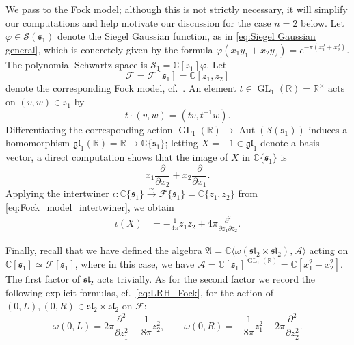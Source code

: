 \documentclass[reqno, 11pt]{amsart} %
\numberwithin{equation}{section}
\theoremstyle{plain}
\theoremstyle{definition}
\theoremstyle{remark}
\newcommand{\mbC}{\mathbb{C}}
\newcommand{\mcS}{\mathcal{S}}
\newcommand{\mfl}{\mathfrak{l}}
\newcommand{\mfs}{\mathfrak{s}}
\newcommand{\mfsl}{\mfs\mfl}
\newcommand{\bbC}{\mathbb C}
\newcommand{\calF}{\mathcal F}
\newcommand{\lie}[1]{ \mathfrak{#1}}
\newcommand{\isomto}{\stackrel{\sim}{\longrightarrow}}
\DeclareMathOperator{\GL}{GL}
\DeclareMathOperator{\Aut}{Aut}
\begin{document}
We pass to the Fock model; although this is not strictly necessary, it will simplify our computations  and help motivate our discussion for the case $n=2$ below. Let $\varphi \in \mcS(\mfs_1)$ denote the Siegel Gaussian function, as in  \eqref{eq:Siegel Gaussian general}, which is concretely given by the formula $\varphi(x_1 y_1 + x_2 y_2) = e^{- \pi (x_1^2 + x_2^2)}$. The polynomial Schwartz space is $\mathcal S_1 = \mathbb C[\lie{s_1}] \varphi$. Let
\[
\mathcal F = \mathcal F[ \lie s_1] = \bbC[z_1, z_2]
\]
denote the corresponding Fock model, cf.\ .
An element $t \in \GL_1(\mathbb R) = \mathbb R^{\times}$ acts on $ (v,w) \in \lie s_1$ by
\[ t\cdot (v,w) = (tv, t^{-1}w).
\]
Differentiating the corresponding action $\GL_1(\mathbb R) \to \Aut(\mcS(\lie s_1))$ induces a homomorphism $\lie{gl}_1(\mathbb R) = \mathbb R  \to \bbC\{ \lie s_1\}$; letting  $X = - 1 \in \lie{gl}_1$ denote a basis vector, a direct computation shows that the image of $X$ in $\bbC\{\lie s_1\}$ is
\[
x_1 \frac{\partial}{\partial x_2} + x_2 \frac{\partial}{\partial x_1}.
\]
Applying the intertwiner $\iota \colon \bbC\{\lie s_1\} \isomto \calF\{ \lie s_1\}  = \mathbb C\{ z_1, z_2\}$ from \eqref{eq:Fock_model_intertwiner}, we obtain
\begin{align}\label{eq:n1_Lie_alg_operator}
\iota(X)
&= - \frac{1}{4 \pi } z_1 z_2  + 4 \pi \frac{\partial^2}{\partial z_1 \partial z_2}.
\end{align}

Finally, recall that we have defined the algebra $\mathfrak A = \mbC\langle ω(\mfsl_2 \times \mfsl_2), \mathcal A\rangle$ acting on $\bbC[\lie s_1] \simeq \calF[\lie s_1]$, where in this case, we have  $\mathcal A = \mathbb C[\lie s_1]^{\GL_1(\mathbb R)} = \mathbb C[ x_1^2 - x_2^2]$. The first factor of $\lie{sl}_2$ acts trivially. As for the second factor we record the following explicit formulas, cf.\ \eqref{eq:LRH_Fock}, for the action of $(0,L), (0,R) \in \lie{sl}_2 \times \lie{sl}_2$ on $\mathcal F$:
\[
\omega(0,L ) = 2 \pi \frac{\partial^2}{\partial z_1^2} - \frac{1}{8 \pi} z_2^2, \qquad \omega(0,R) = - \frac{1}{8 \pi} z_1^2 + 2 \pi \frac{\partial^2}{\partial z_2^2}.
\]
\end{document}
